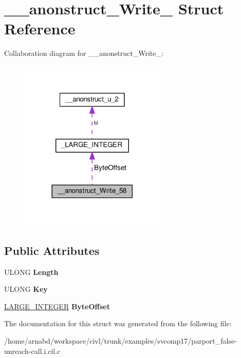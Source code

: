 \hypertarget{struct____anonstruct__Write__58}{}\section{\+\_\+\+\_\+anonstruct\+\_\+\+Write\+\_ Struct Reference}
\label{struct____anonstruct__Write__58}


Collaboration diagram for \+\_\+\+\_\+anonstruct\+\_\+\+Write\+\_\+:
\nopagebreak
\begin{figure}[H]
\begin{center}
\leavevmode
\includegraphics[width=197pt]{struct____anonstruct__Write__58__coll__graph}
\end{center}
\end{figure}
\subsection*{Public Attributes}
\begin{DoxyCompactItemize}
\item 
\hypertarget{struct____anonstruct__Write__58_a70dd2dee83e82c2365f69747fb75635a}{}U\+L\+O\+N\+G {\bfseries Length}\label{struct____anonstruct__Write__58_a70dd2dee83e82c2365f69747fb75635a}

\item 
\hypertarget{struct____anonstruct__Write__58_ad475a24caa85c53510603db4e6b9c31b}{}U\+L\+O\+N\+G {\bfseries Key}\label{struct____anonstruct__Write__58_ad475a24caa85c53510603db4e6b9c31b}

\item 
\hypertarget{struct____anonstruct__Write__58_aa60c337ede26284d939726a1c9d111e5}{}\hyperlink{union__LARGE__INTEGER}{L\+A\+R\+G\+E\+\_\+\+I\+N\+T\+E\+G\+E\+R} {\bfseries Byte\+Offset}\label{struct____anonstruct__Write__58_aa60c337ede26284d939726a1c9d111e5}

\end{DoxyCompactItemize}


The documentation for this struct was generated from the following file\+:\begin{DoxyCompactItemize}
\item 
/home/arnabd/workspace/civl/trunk/examples/svcomp17/parport\+\_\+false-\/unreach-\/call.\+i.\+cil.\+c\end{DoxyCompactItemize}
